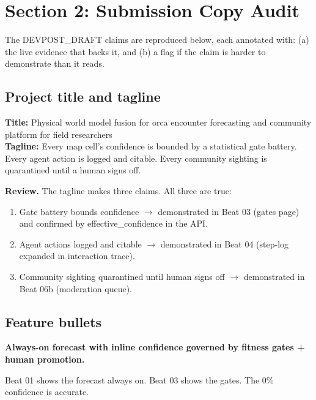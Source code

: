 \section{Section 2: Submission Copy Audit}

The DEVPOST\_DRAFT claims are reproduced below, each annotated with: (a) the live evidence that backs it, and (b) a flag if the claim is harder to demonstrate than it reads.

\subsection{Project title and tagline}

\begin{notebox}
\textbf{Title:} Physical world model fusion for orca encounter forecasting and community platform for field researchers\\
\textbf{Tagline:} Every map cell's confidence is bounded by a statistical gate battery. Every agent action is logged and citable. Every community sighting is quarantined until a human signs off.
\end{notebox}

\textbf{Review.} The tagline makes three claims. All three are true:
\begin{enumerate}
\item Gate battery bounds confidence $\to$ demonstrated in Beat 03 (gates page) and confirmed by effective\_confidence in the API.
\item Agent actions logged and citable $\to$ demonstrated in Beat 04 (step-log expanded in interaction trace). 
\item Community sighting quarantined until human signs off $\to$ demonstrated in Beat 06b (moderation queue). 
\end{enumerate}

\subsection{Feature bullets}

\textbf{Always-on forecast with inline confidence governed by fitness gates + human promotion.}
\begin{notebox}
\OK{} Beat 01 shows the forecast always on. Beat 03 shows the gates. The 0\% confidence is accurate. 
\end{notebox}

